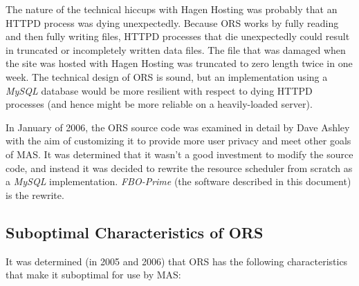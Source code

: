 \documentclass[letterpaper,10pt,titlepage]{article}
\newcommand{\productbasename}{FBO-Prime}
\begin{document}
The nature of the technical hiccups with Hagen Hosting was probably that
an HTTPD process was dying unexpectedly.  Because ORS works by fully reading
and then fully writing files, HTTPD processes that die unexpectedly could result
in truncated or incompletely written data files.  The file that was damaged
when the site was hosted with Hagen Hosting was truncated to zero length twice
in one week.  The technical design of ORS is sound, but an implementation
using a \emph{MySQL} 
\cite{bibref:c:mysql} database would be more resilient with respect to 
dying HTTPD processes (and hence might be more reliable on a heavily-loaded server).

In January of 2006, the ORS source code was examined in detail by
Dave Ashley with the aim of customizing it to provide more user privacy
and meet other goals of MAS\@. It was determined that it wasn't a good investment to
modify the source code, and instead it was decided to rewrite the resource scheduler 
from scratch as a \emph{MySQL} implementation. 
\emph{\productbasename{}} (the software described in this document)
is the rewrite.



\subsection{Suboptimal Characteristics of ORS}
\label{siov0:ssco0}

It was determined (in 2005 and 2006)
that ORS \cite{bibref:p:ors}
has the following characteristics that make it suboptimal
for use by MAS:
\end{document}
